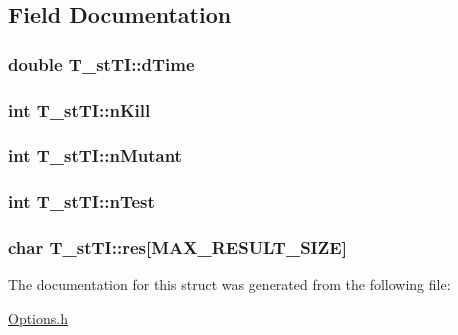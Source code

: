 \subsection{Field Documentation}
\hypertarget{structT__stTI_ac66faf2192de9672574effb26319b45f}{
\subsubsection[{d\-Time}]{\setlength{\rightskip}{0pt plus 5cm}double T\-\_\-st\-T\-I\-::d\-Time}}\label{structT__stTI_ac66faf2192de9672574effb26319b45f}
\hypertarget{structT__stTI_ad62dfc2b1cd7514a9d587d2869972be7}{
\subsubsection[{n\-Kill}]{\setlength{\rightskip}{0pt plus 5cm}int T\-\_\-st\-T\-I\-::n\-Kill}}\label{structT__stTI_ad62dfc2b1cd7514a9d587d2869972be7}
\hypertarget{structT__stTI_a4a30d643762e8a2c31455bc188395496}{
\subsubsection[{n\-Mutant}]{\setlength{\rightskip}{0pt plus 5cm}int T\-\_\-st\-T\-I\-::n\-Mutant}}\label{structT__stTI_a4a30d643762e8a2c31455bc188395496}
\hypertarget{structT__stTI_a961acc1a141fcef1ccd9c5e492c5b2a9}{
\subsubsection[{n\-Test}]{\setlength{\rightskip}{0pt plus 5cm}int T\-\_\-st\-T\-I\-::n\-Test}}\label{structT__stTI_a961acc1a141fcef1ccd9c5e492c5b2a9}
\hypertarget{structT__stTI_ac05a161709d3f1eec760d11aa13fc0b7}{
\subsubsection[{res}]{\setlength{\rightskip}{0pt plus 5cm}char T\-\_\-st\-T\-I\-::res\mbox{[}{\bf M\-A\-X\-\_\-\-R\-E\-S\-U\-L\-T\-\_\-\-S\-I\-Z\-E}\mbox{]}}}\label{structT__stTI_ac05a161709d3f1eec760d11aa13fc0b7}


The documentation for this struct was generated from the following file\-:\begin{DoxyCompactItemize}
\item 
\hyperlink{Options_8h}{Options.\-h}\end{DoxyCompactItemize}
